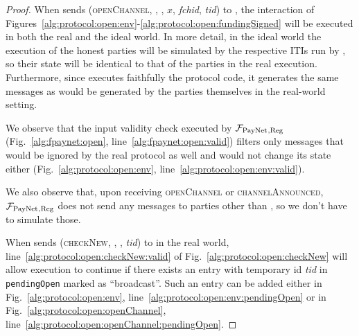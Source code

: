   \begin{proof}
    When \environment{} sends (\textsc{openChannel}, \alice, \bob, $x$,
    \textit{fchid}, \textit{tid}) to \alice, the interaction of
    Figures~\ref{alg:protocol:open:env}-\ref{alg:protocol:open:fundingSigned}
    will be executed in both the real and the ideal world. In more detail, in
    the ideal world the execution of the honest parties will be simulated by the
    respective ITIs run by \simulator, so their state will be identical to that
    of the parties in the real execution. Furthermore, since \simulator{}
    executes faithfully the protocol code, it generates the same messages as
    would be generated by the parties themselves in the real-world setting.

    We observe that the input validity check executed by $\mathcal{F}_{\mathrm{PayNet}}{}_{\mathrm{,
    Reg}}$ (Fig.~\ref{alg:fpaynet:open}, line~\ref{alg:fpaynet:open:valid})
    filters only messages that would be ignored by the real protocol as well and
    would not change its state either (Fig.~\ref{alg:protocol:open:env},
    line~\ref{alg:protocol:open:env:valid}).

    We also observe that, upon receiving \textsc{openChannel} or
    \textsc{channelAnnounced}, $\mathcal{F}_{\mathrm{PayNet}}{}_{\mathrm{, Reg}}$ does not send any
    messages to parties other than \simulator, so we don't have to simulate
    those.

    When \environment{} sends (\textsc{checkNew}, \alice, \bob, \textit{tid}) to
    \alice in the real world, line~\ref{alg:protocol:open:checkNew:valid} of
    Fig.~\ref{alg:protocol:open:checkNew} will allow execution to continue if
    there exists an entry with temporary id \textit{tid} in
    \texttt{pendingOpen} marked as ``broadcast''. Such an entry can be added
    either in Fig.~\ref{alg:protocol:open:env},
    line~\ref{alg:protocol:open:env:pendingOpen} or in
    Fig.~\ref{alg:protocol:open:openChannel},
    line~\ref{alg:protocol:open:openChannel:pendingOpen}. %
  \end{proof}
